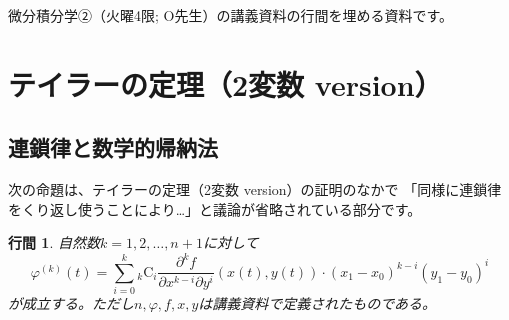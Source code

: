 \documentclass{article}
\newtheorem{lemma}{行間}
\newcommand{\combination}[2]{{}_{#1} \mathrm{C}_{#2}}
\begin{document}
微分積分学②（火曜4限; O先生）の講義資料の行間を埋める資料です。
\tableofcontents
\newpage

\setcounter{section}{7}
\section{テイラーの定理（2変数 version）}

\subsection{連鎖律と数学的帰納法}
次の命題は、テイラーの定理（2変数 version）の証明のなかで
「同様に連鎖律をくり返し使うことにより…」と議論が省略されている部分です。
\begin{screen}
    \begin{lemma}
        自然数$k=1,2,\dots,n+1$に対して
        \begin{equation}
            \label{lemma:1}
            \varphi^{(k)}(t)
            =
            \sum_{i=0}^{k}
                \combination{k}{i}
                \frac{\partial^k f}{\partial x^{k-i} \partial y^{i}} (x(t), y(t))
                \cdot
                (x_1 - x_0)^{k-i}
                (y_1 - y_0)^{i}
        \end{equation}
        が成立する。ただし$n, \varphi, f, x, y$は講義資料で定義されたものである。
    \end{lemma}
\end{screen}
\end{document}
